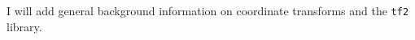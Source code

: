{\color{red}I will add general background information on coordinate transforms and the \texttt{tf2} library.}